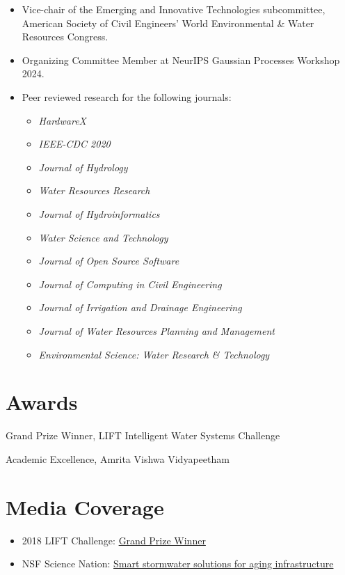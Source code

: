 \documentclass[a4paper,11pt]{article}
\newcommand{\years}[1]{%
  {\reversemarginpar\strut\marginnote{{\small#1}}}%
}
\begin{document}
\begin{itemize}
	\item Vice-chair of the Emerging and Innovative Technologies subcommittee, American Society of Civil Engineers' World Environmental \& Water Resources Congress.
	\item Organizing Committee Member at NeurIPS Gaussian Processes Workshop 2024.
	\item Peer reviewed research for the following journals:
	\begin{itemize}
	\setlength\itemsep{0mm}
		\item \textit{HardwareX}
		\item \textit{IEEE-CDC 2020}
		\item \textit{Journal of Hydrology}
		\item \textit{Water Resources Research}
		\item \textit{Journal of Hydroinformatics}
		\item \textit{Water Science and Technology}
		\item \textit{Journal of Open Source Software}
		\item \textit{Journal of Computing in Civil Engineering}
		\item \textit{Journal of Irrigation and Drainage Engineering}
		\item \textit{Journal of Water Resources Planning and Management}
		\item \textit{Environmental Science: Water Research \& Technology}
	\end{itemize}
\end{itemize}

\section*{Awards}
\years{2018}
Grand Prize Winner, LIFT Intelligent Water Systems Challenge\\

\years{2013, 2015}
Academic Excellence, Amrita Vishwa Vidyapeetham

\section*{Media Coverage}

\begin{itemize}
	\item 2018 LIFT Challenge: \href{https://cee.engin.umich.edu/stories/joint-u-m-and-glwa-team-wins-inaugural-intelligent-water-challenge/}{Grand Prize Winner}
	\item NSF Science Nation: \href{https://www.youtube.com/watch?v=mStPThxAU08}{Smart stormwater solutions for aging infrastructure}
\end{itemize}
\end{document}
